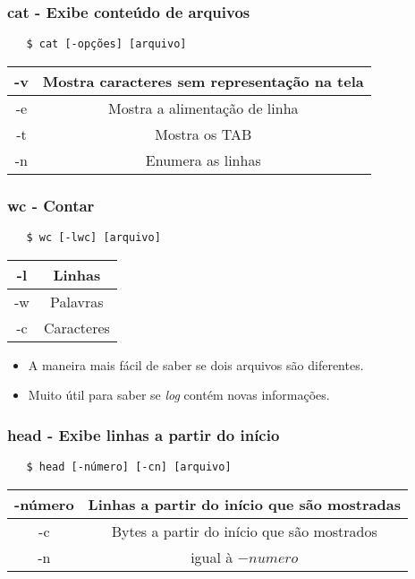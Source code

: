 \documentclass{beamer}
\begin{document}
\begin{frame}[fragile]
   \frametitle{cat - Exibe conteúdo de arquivos}
   \begin{verbatim}
   $ cat [-opções] [arquivo]
   \end{verbatim}
   \begin{table}
      \begin{tabular}{ c | c }
         -v & Mostra caracteres sem representação na tela \\
         \hline 
         -e & Mostra a alimentação de linha \\
         \hline
         -t & Mostra os TAB \\
         \hline
         -n & Enumera as linhas \\
      \end{tabular}
   \end{table}
\end{frame}

\begin{frame}[fragile]
   \frametitle{wc - Contar}
   \begin{verbatim}
   $ wc [-lwc] [arquivo]
   \end{verbatim}
   \begin{table}
      \begin{tabular}{ c | c }
         -l & Linhas \\
         \hline 
         -w & Palavras \\
         \hline
         -c & Caracteres \\
      \end{tabular}
   \end{table}
   \begin{itemize}
      \item A maneira mais fácil de saber se dois arquivos são diferentes.
      \item Muito útil para saber se \textit{log} contém novas informações.
   \end{itemize}
\end{frame}

\begin{frame}[fragile]
   \frametitle{head - Exibe linhas a partir do início}
   \begin{verbatim}
   $ head [-número] [-cn] [arquivo] 
   \end{verbatim}
   \begin{table}
      \begin{tabular}{ c | c }
         -número & Linhas a partir do início que são mostradas \\
         \hline 
         -c & Bytes a partir do início que são mostrados \\
         \hline
         -n & igual à $-numero$ \\
      \end{tabular}
   \end{table}
\end{frame}
\end{document}
